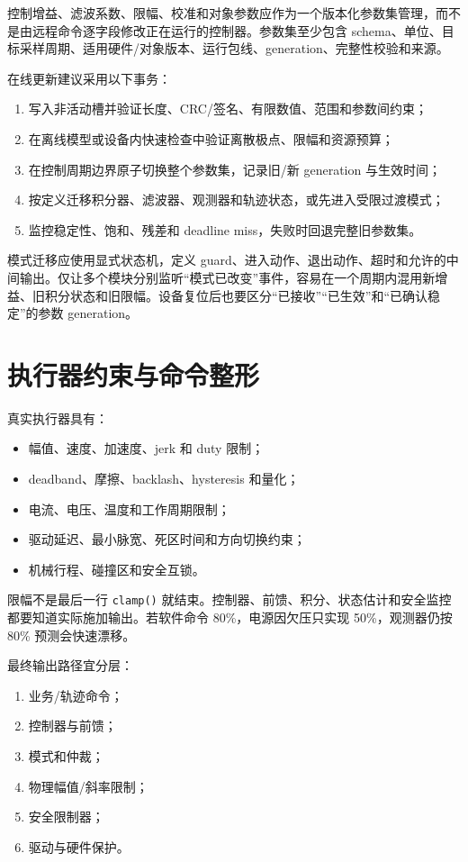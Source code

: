 控制增益、滤波系数、限幅、校准和对象参数应作为一个版本化参数集管理，而不是由远程命令逐字段修改正在运行的控制器。参数集至少包含 schema、单位、目标采样周期、适用硬件/对象版本、运行包线、generation、完整性校验和来源。

在线更新建议采用以下事务：
\begin{enumerate}
  \item 写入非活动槽并验证长度、CRC/签名、有限数值、范围和参数间约束；
  \item 在离线模型或设备内快速检查中验证离散极点、限幅和资源预算；
  \item 在控制周期边界原子切换整个参数集，记录旧/新 generation 与生效时间；
  \item 按定义迁移积分器、滤波器、观测器和轨迹状态，或先进入受限过渡模式；
  \item 监控稳定性、饱和、残差和 deadline miss，失败时回退完整旧参数集。
\end{enumerate}

模式迁移应使用显式状态机，定义 guard、进入动作、退出动作、超时和允许的中间输出。仅让多个模块分别监听“模式已改变”事件，容易在一个周期内混用新增益、旧积分状态和旧限幅。设备复位后也要区分“已接收”“已生效”和“已确认稳定”的参数 generation。

\section{执行器约束与命令整形}

真实执行器具有：

\begin{itemize}
  \item 幅值、速度、加速度、jerk 和 duty 限制；
  \item deadband、摩擦、backlash、hysteresis 和量化；
  \item 电流、电压、温度和工作周期限制；
  \item 驱动延迟、最小脉宽、死区时间和方向切换约束；
  \item 机械行程、碰撞区和安全互锁。
\end{itemize}

限幅不是最后一行 \texttt{clamp()} 就结束。控制器、前馈、积分、状态估计和安全监控都要知道实际施加输出。若软件命令 80\%，电源因欠压只实现 50\%，观测器仍按 80\% 预测会快速漂移。

最终输出路径宜分层：

\begin{enumerate}
  \item 业务/轨迹命令；
  \item 控制器与前馈；
  \item 模式和仲裁；
  \item 物理幅值/斜率限制；
  \item 安全限制器；
  \item 驱动与硬件保护。
\end{enumerate}

